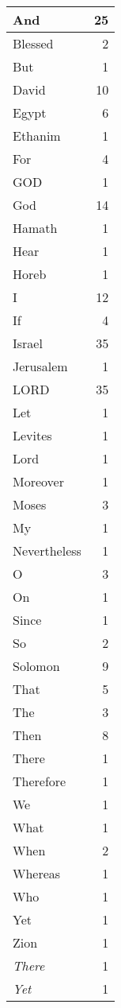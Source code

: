 \begin{center}
\begin{longtable}{l|r}
\hline \hline
\endlastfoot
And & 25 \\ \hline
Blessed & 2 \\ \hline
But & 1 \\ \hline
David & 10 \\ \hline
Egypt & 6 \\ \hline
Ethanim & 1 \\ \hline
For & 4 \\ \hline
GOD & 1 \\ \hline
God & 14 \\ \hline
Hamath & 1 \\ \hline
Hear & 1 \\ \hline
Horeb & 1 \\ \hline
I & 12 \\ \hline
If & 4 \\ \hline
Israel & 35 \\ \hline
Jerusalem & 1 \\ \hline
LORD & 35 \\ \hline
Let & 1 \\ \hline
Levites & 1 \\ \hline
Lord & 1 \\ \hline
Moreover & 1 \\ \hline
Moses & 3 \\ \hline
My & 1 \\ \hline
Nevertheless & 1 \\ \hline
O & 3 \\ \hline
On & 1 \\ \hline
Since & 1 \\ \hline
So & 2 \\ \hline
Solomon & 9 \\ \hline
That & 5 \\ \hline
The & 3 \\ \hline
Then & 8 \\ \hline
There & 1 \\ \hline
Therefore & 1 \\ \hline
We & 1 \\ \hline
What & 1 \\ \hline
When & 2 \\ \hline
Whereas & 1 \\ \hline
Who & 1 \\ \hline
Yet & 1 \\ \hline
Zion & 1 \\ \hline
\emph{There} & 1 \\ \hline
\emph{Yet} & 1 \\ \hline

\end{longtable}
\end{center}
